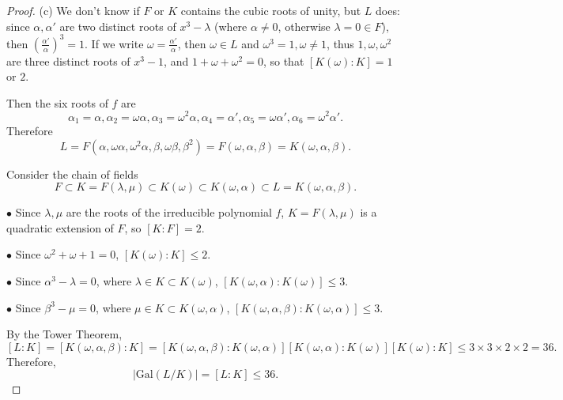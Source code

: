 \documentclass[11pt,a4paper]{article}
\newcommand{\Gal}{\mathrm{Gal}}
\begin{document}
\begin{proof}
\item[(c)] We don't know if $F$ or $K$ contains the cubic roots of unity, but $L$ does: since $\alpha, \alpha'$ are two distinct roots of $x^3 - \lambda$ (where $\alpha \ne 0$, otherwise $\lambda = 0 \in F$), then $(\frac{\alpha'}{\alpha})^3 = 1$. If we write $\omega = \frac{\alpha'}{\alpha}$, then $\omega \in L$ and $\omega^3 = 1, \omega\ne 1$, thus $1,\omega, \omega^2$ are three distinct roots of $x^3 - 1$, and $1 + \omega + \omega^2 = 0$, so that $[K(\omega) : K ] = 1$ or $2$. 

Then the six roots of $f$ are 
$$\alpha_1 = \alpha, \alpha_2 = \omega \alpha, \alpha_3 = \omega^2 \alpha, \alpha_4 = \alpha', \alpha_5 = \omega \alpha', \alpha_6 = \omega^2 \alpha'.$$
Therefore
$$L = F(\alpha,\omega \alpha, \omega^2 \alpha, \beta, \omega \beta, \beta^2) = F(\omega,\alpha,\beta) = K(\omega, \alpha, \beta). $$

Consider the chain of fields
$$F \subset K = F(\lambda, \mu) \subset K(\omega) \subset K(\omega,\alpha) \subset L = K(\omega, \alpha, \beta).$$

\begin{center}
\end{center}


$\bullet$ Since $\lambda,\mu$ are the roots of the irreducible polynomial $f$, $K=F(\lambda,\mu)$ is a quadratic extension of $F$, so $[K:F] = 2$.

$\bullet$ Since $\omega^2 + \omega + 1 = 0$, $[K(\omega) : K] \leq 2$.

$\bullet$ Since $\alpha^3 - \lambda = 0$, where $\lambda \in K \subset K(\omega)$, $[K(\omega,\alpha) : K(\omega)] \leq 3$.

$\bullet$ Since $\beta^3 - \mu = 0$, where $\mu \in K \subset K(\omega, \alpha)$,  $[K(\omega, \alpha,\beta) : K(\omega, \alpha)] \leq 3$.

By the Tower Theorem,
$$[L:K] = [K(\omega, \alpha,\beta) : K] = [K(\omega, \alpha,\beta) : K(\omega, \alpha)] [K(\omega,\alpha) : K(\omega)][K(\omega) : K]  \leq 3\times3 \times2 \times 2 = 36.$$
Therefore,
$$|\Gal(L/K) | = [L:K] \leq 36.$$
\end{proof}
\end{document}

